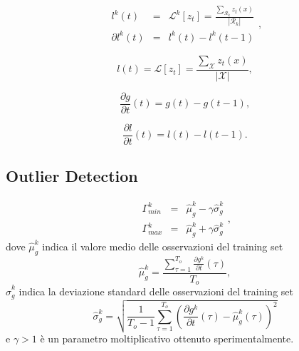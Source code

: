 \documentclass{llncs}
\begin{document}
\begin{equation}
\label{eq:lumaRegions}
\begin{array}{ccc}
l^k(t)&  = & \mathcal{L}^k[z_t] = \frac{\sum_{\mathcal{R}_k} z_t(x) }{|{\mathcal{R}_k}|}\\
\partial l^k(t) & =& l^k(t)-l^k(t-1) 
\end{array},
\end{equation}


\begin{equation}
\label{eq:energyLuma}
l(t) = \mathcal{L}[z_t] =\frac{\sum_{\mathcal{X}} z_t(x) }{|\mathcal{X}|} ,
\end{equation}  


\begin{equation}
\label{eq:gradientDetr}
\frac{\partial g}{\partial t}(t) = g(t) - g(t-1),
\end{equation}


\begin{equation}
\label{eq:lumaDetr}
\frac{\partial l}{\partial t}(t) = l(t) - l(t-1).
\end{equation}


\subsection{Outlier Detection}\label{subsec:MonitoringScheme}



\begin{equation}
\label{eq:soglieGradiente}
\begin{array}{lcl}
\Gamma_{min}^k & = & \hat{\mu}_g^k -\gamma \hat{\sigma}_g^k\\
\Gamma_{max}^k & = & \hat{\mu}_g^k + \gamma \hat{\sigma}_g^k
\end{array},
\end{equation}
dove $\hat{\mu}_g^k$ indica il valore medio delle osservazioni del training set
\begin{equation}
\hat{\mu}_g^k = \frac{\sum_{\tau = 1}^{T_{o}} \frac{\partial g^k}{\partial t}(\tau)}{T_{o}}, \nonumber
\end{equation}
$\hat{\sigma}_g^k$ indica la deviazione standard delle osservazioni del training set
\begin{equation}
\hat{\sigma}_g^k  = \sqrt{\frac{1}{T_{o}-1}\sum_{\tau=1}^{T_{o}}\left(\frac{\partial g^k}{\partial t}(\tau) - \hat{\mu}_g^k(\tau)\right)^2} \nonumber
\end{equation}
e $\gamma>1$ \`e un parametro moltiplicativo ottenuto sperimentalmente.\\
\end{document}
